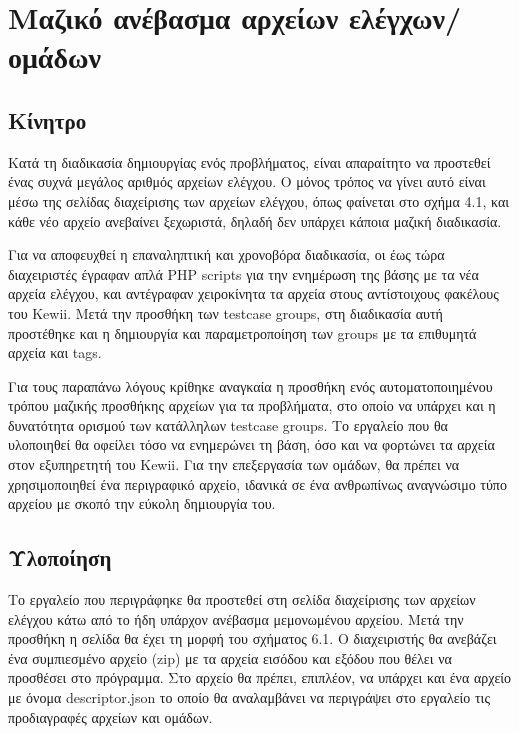 \documentclass[diploma]{softlab-thesis}
\begin{document}
\section{Μαζικό ανέβασμα αρχείων ελέγχων/ομάδων}

\subsection{Κίνητρο}

Κατά τη διαδικασία δημιουργίας ενός προβλήματος, είναι απαραίτητο να προστεθεί
ένας συχνά μεγάλος αριθμός αρχείων ελέγχου. Ο μόνος τρόπος να γίνει αυτό είναι
μέσω της σελίδας διαχείρισης των αρχείων ελέγχου, όπως φαίνεται στο σχήμα 4.1,
και κάθε νέο αρχείο ανεβαίνει ξεχωριστά, δηλαδή δεν υπάρχει κάποια μαζική
διαδικασία.

\bigskip

Για να αποφευχθεί η επαναληπτική και χρονοβόρα διαδικασία, οι έως τώρα διαχειριστές
έγραφαν απλά PHP scripts για την ενημέρωση της βάσης με τα νέα αρχεία ελέγχου,
και αντέγραφαν χειροκίνητα τα αρχεία στους αντίστοιχους φακέλους του Kewii.
Μετά την προσθήκη των testcase groups, στη διαδικασία αυτή προστέθηκε και
η δημιουργία και παραμετροποίηση των groups με τα επιθυμητά αρχεία και tags.

\bigskip

Για τους παραπάνω λόγους κρίθηκε αναγκαία η προσθήκη ενός αυτοματοποιημένου
τρόπου μαζικής προσθήκης αρχείων για τα προβλήματα, στο οποίο να υπάρχει και η
δυνατότητα ορισμού των κατάλληλων testcase groups. Το εργαλείο που θα
υλοποιηθεί θα οφείλει τόσο να ενημερώνει τη βάση, όσο και να φορτώνει τα αρχεία
στον εξυπηρετητή του Kewii. Για την επεξεργασία των ομάδων, θα πρέπει να
χρησιμοποιηθεί ένα περιγραφικό αρχείο, ιδανικά σε ένα ανθρωπίνως αναγνώσιμο
τύπο αρχείου με σκοπό την εύκολη δημιουργία του.

\subsection{Υλοποίηση}

Το εργαλείο που περιγράφηκε θα προστεθεί στη σελίδα διαχείρισης των αρχείων
ελέγχου κάτω από το ήδη υπάρχον ανέβασμα μεμονωμένου αρχείου. Μετά την προσθήκη
η σελίδα θα έχει τη μορφή του σχήματος 6.1. Ο διαχειριστής θα ανεβάζει ένα
συμπιεσμένο αρχείο (zip) με τα αρχεία εισόδου και εξόδου που θέλει να προσθέσει
στο πρόγραμμα. Στο αρχείο θα πρέπει, επιπλέον, να υπάρχει και ένα αρχείο με
όνομα descriptor.json το οποίο θα αναλαμβάνει να περιγράψει στο εργαλείο τις
προδιαγραφές αρχείων και ομάδων.
\end{document}

